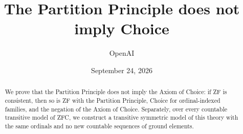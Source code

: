 \documentclass[11pt]{article}
\title{The Partition Principle does not imply Choice}
\author{OpenAI}
\date{September 24, 2026}
\numberwithin{equation}{section}
\theoremstyle{definition}
\theoremstyle{remark}
\begin{document}
\maketitle
\begin{abstract}
We prove that the Partition Principle does not imply the Axiom of Choice:
if ZF is consistent, then so is ZF with the Partition Principle, Choice for
ordinal-indexed families, and the negation of the Axiom of Choice.
Separately, over every countable transitive model of ZFC, we construct a
transitive symmetric model of this theory with the same ordinals and no new
countable sequences of ground elements.
\end{abstract}
\tableofcontents
\clearpage






{\small\raggedright

}
\end{document}

